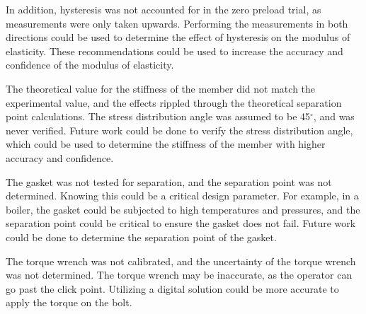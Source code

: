 In addition, hysteresis was not accounted for in the zero preload trial, as measurements were only taken upwards. Performing the measurements in both directions could be used to determine the effect of hysteresis on the modulus of elasticity. These recommendations could be used to increase the accuracy and confidence of the modulus of elasticity.

The theoretical value for the stiffness of the member did not match the experimental value, and the effects rippled through the theoretical separation point calculations. The stress distribution angle was assumed to be 45$^\circ$, and was never verified. Future work could be done to verify the stress distribution angle, which could be used to determine the stiffness of the member with higher accuracy and confidence.

The gasket was not tested for separation, and the separation point was not determined. Knowing this could be a critical design parameter. For example, in a boiler, the gasket could be subjected to high temperatures and pressures, and the separation point could be critical to ensure the gasket does not fail. Future work could be done to determine the separation point of the gasket.

The torque wrench was not calibrated, and the uncertainty of the torque wrench was not determined. The torque wrench may be inaccurate, as the operator can go past the click point. Utilizing a digital solution could be more accurate to apply the torque on the bolt.
